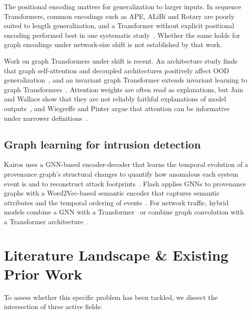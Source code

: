 \documentclass[a4paper,10pt]{article}
\begin{document}
The positional encoding matters for generalization to larger inputs. In sequence Transformers, common encodings such as APE, ALiBi and Rotary are poorly suited to length generalization, and a Transformer without explicit positional encoding performed best in one systematic study~\cite{kazemnejad2023pe}. Whether the same holds for graph encodings under network-size shift is not established by that work.

Work on graph Transformers under shift is recent. An architecture study finds that graph self-attention and decoupled architectures positively affect OOD generalization~\cite{guo2024ood}, and an invariant graph Transformer extends invariant learning to graph Transformers~\cite{liao2026igt}. Attention weights are often read as explanations, but Jain and Wallace show that they are not reliably faithful explanations of model outputs~\cite{jain2019attention}, and Wiegreffe and Pinter argue that attention can be informative under narrower definitions~\cite{wiegreffe2019attention}.

\subsection{Graph learning for intrusion detection}

Kairos uses a GNN-based encoder-decoder that learns the temporal evolution of a provenance graph's structural changes to quantify how anomalous each system event is and to reconstruct attack footprints~\cite{cheng2024kairos}. Flash applies GNNs to provenance graphs with a Word2Vec-based semantic encoder that captures semantic attributes and the temporal ordering of events~\cite{rehman2024flash}. For network traffic, hybrid models combine a GNN with a Transformer~\cite{xie2026hybrid,zhang2024icist} or combine graph convolution with a Transformer architecture~\cite{appiahene2026hybrid}.


\section{Literature Landscape \texorpdfstring{\&}{and} Existing Prior Work}
\label{sec:landscape}

To assess whether this specific problem has been tackled, we dissect the intersection of three active fields:
\end{document}
